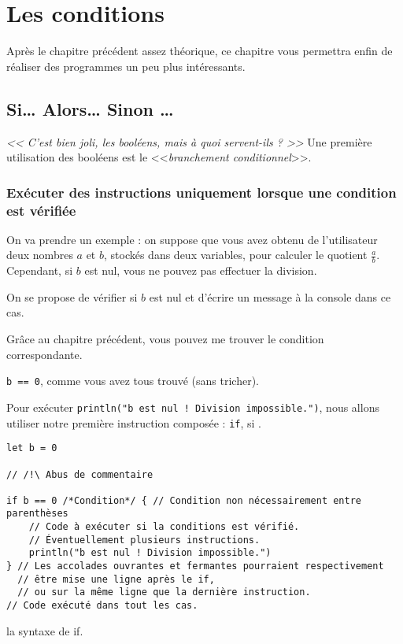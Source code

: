 \chapter{Les conditions}
Après le chapitre précédent assez théorique, ce chapitre vous permettra enfin de réaliser des programmes un peu plus intéressants.
\section{Si… Alors… Sinon …}
\emph{<< C'est bien joli, les booléens, mais à quoi servent-ils ? >>}
Une première utilisation des booléens est le <<\emph{branchement conditionnel}>>.
\subsection{Exécuter des instructions uniquement lorsque une condition est vérifiée}
On va prendre un exemple : on suppose que vous avez obtenu de l'utilisateur deux nombres $a$ et $b$, stockés dans deux variables, pour calculer le quotient $\frac{a}{b}$.
Cependant, si $b$ est nul, vous ne pouvez pas effectuer la division. %

On se propose de vérifier si $b$ est nul et d'écrire un message à la console dans ce cas.

Grâce au chapitre précédent, vous pouvez me trouver le condition correspondante.

\pagebreak %
\texttt{b == 0}, comme vous avez tous trouvé (sans tricher).

Pour exécuter \texttt{println("b est nul ! Division impossible.")}, nous allons utiliser notre première instruction composée : \texttt{if}, \og si \fg{}.

\begin{listing}[h]
\begin{verbatim}
let b = 0

// /!\ Abus de commentaire

if b == 0 /*Condition*/ { // Condition non nécessairement entre parenthèses
    // Code à exécuter si la conditions est vérifié.
    // Éventuellement plusieurs instructions.
    println("b est nul ! Division impossible.")
} // Les accolades ouvrantes et fermantes pourraient respectivement
  // être mise une ligne après le if,
  // ou sur la même ligne que la dernière instruction.
// Code exécuté dans tout les cas.
\end{verbatim}
\caption{la syntaxe de if.}
\end{listing}
